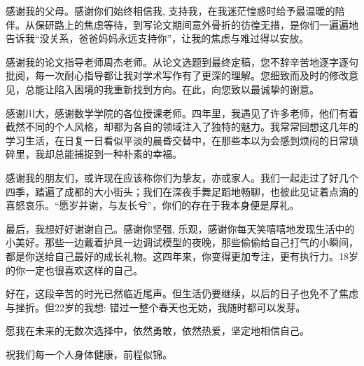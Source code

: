 \documentclass[a4paper, AutoFakeBold, UTF8]{ctexrep}
\theoremstyle{plain}
\numberwithin{equation}{chapter}
\begin{document}
感谢我的父母。感谢你们始终相信我, 支持我，在我迷茫惶惑时给予最温暖的陪伴。从保研路上的焦虑等待，到写论文期间意外骨折的彷徨无措，是你们一遍遍地告诉我“没关系，爸爸妈妈永远支持你”，让我的焦虑与难过得以安放。

感谢我的论文指导老师周杰老师。从论文选题到最终定稿，您不辞辛苦地逐字逐句批阅，每一次耐心指导都让我对学术写作有了更深的理解。您细致而及时的修改意见，总能让陷入困境的我重新找到方向。在此，向您致以最诚挚的谢意。

感谢川大，感谢数学学院的各位授课老师。四年里，我遇见了许多老师，他们有着截然不同的个人风格，却都为各自的领域注入了独特的魅力。我常常回想这几年的学习生活，在日复一日看似平淡的晨昏交替中，在那些本以为会感到烦闷的日常琐碎里，我却总能捕捉到一种朴素的幸福。

感谢我的朋友们，或许现在应该称你们为挚友，亦或家人。我们一起走过了好几个四季，踏遍了成都的大小街头；我们在深夜手舞足蹈地畅聊，也彼此见证着点滴的喜怒哀乐。“愿岁并谢，与友长兮”，你们的存在于我本身便是厚礼。

最后，我想好好谢谢自己。感谢你坚强, 乐观，感谢你每天笑嘻嘻地发现生活中的小美好。那些一边戴着护具一边调试模型的夜晚，那些偷偷给自己打气的小瞬间，都是你送给自己最好的成长礼物。这四年来，你变得更加专注，更有执行力。18岁的你一定也很喜欢这样的自己。

好在，这段辛苦的时光已然临近尾声。但生活仍要继续，以后的日子也免不了焦虑与挫折。但22岁的我想: 错过一整个春天也无妨，我随时都可以发芽。

愿我在未来的无数次选择中，依然勇敢，依然热爱，坚定地相信自己。

祝我们每一个人身体健康，前程似锦。
\end{document}
